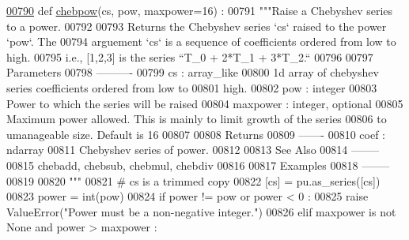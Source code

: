 \begin{DoxyCode}
\hypertarget{namespacepyneb_1_1utils_1_1chebyshev_l00790}{}\hyperlink{namespacepyneb_1_1utils_1_1chebyshev_ab647ff3aa7750a09b934b98cddd4c90d}{00790} \textcolor{keyword}{def }\hyperlink{namespacepyneb_1_1utils_1_1chebyshev_ab647ff3aa7750a09b934b98cddd4c90d}{chebpow}(cs, pow, maxpower=16) :
00791     \textcolor{stringliteral}{"""Raise a Chebyshev series to a power.}
00792 \textcolor{stringliteral}{}
00793 \textcolor{stringliteral}{    Returns the Chebyshev series `cs` raised to the power `pow`. The}
00794 \textcolor{stringliteral}{    arguement `cs` is a sequence of coefficients ordered from low to high.}
00795 \textcolor{stringliteral}{    i.e., [1,2,3] is the series  ``T\_0 + 2*T\_1 + 3*T\_2.``}
00796 \textcolor{stringliteral}{}
00797 \textcolor{stringliteral}{    Parameters}
00798 \textcolor{stringliteral}{    ----------}
00799 \textcolor{stringliteral}{    cs : array\_like}
00800 \textcolor{stringliteral}{        1d array of chebyshev series coefficients ordered from low to}
00801 \textcolor{stringliteral}{        high.}
00802 \textcolor{stringliteral}{    pow : integer}
00803 \textcolor{stringliteral}{        Power to which the series will be raised}
00804 \textcolor{stringliteral}{    maxpower : integer, optional}
00805 \textcolor{stringliteral}{        Maximum power allowed. This is mainly to limit growth of the series}
00806 \textcolor{stringliteral}{        to umanageable size. Default is 16}
00807 \textcolor{stringliteral}{}
00808 \textcolor{stringliteral}{    Returns}
00809 \textcolor{stringliteral}{    -------}
00810 \textcolor{stringliteral}{    coef : ndarray}
00811 \textcolor{stringliteral}{        Chebyshev series of power.}
00812 \textcolor{stringliteral}{}
00813 \textcolor{stringliteral}{    See Also}
00814 \textcolor{stringliteral}{    --------}
00815 \textcolor{stringliteral}{    chebadd, chebsub, chebmul, chebdiv}
00816 \textcolor{stringliteral}{}
00817 \textcolor{stringliteral}{    Examples}
00818 \textcolor{stringliteral}{    --------}
00819 \textcolor{stringliteral}{}
00820 \textcolor{stringliteral}{    """}
00821     \textcolor{comment}{# cs is a trimmed copy}
00822     [cs] = pu.as\_series([cs])
00823     power = int(pow)
00824     \textcolor{keywordflow}{if} power != pow \textcolor{keywordflow}{or} power < 0 :
00825         \textcolor{keywordflow}{raise} ValueError(\textcolor{stringliteral}{"Power must be a non-negative integer."})
00826     \textcolor{keywordflow}{elif} maxpower \textcolor{keywordflow}{is} \textcolor{keywordflow}{not} \textcolor{keywordtype}{None} \textcolor{keywordflow}{and} power > maxpower :

\end{DoxyCode}
